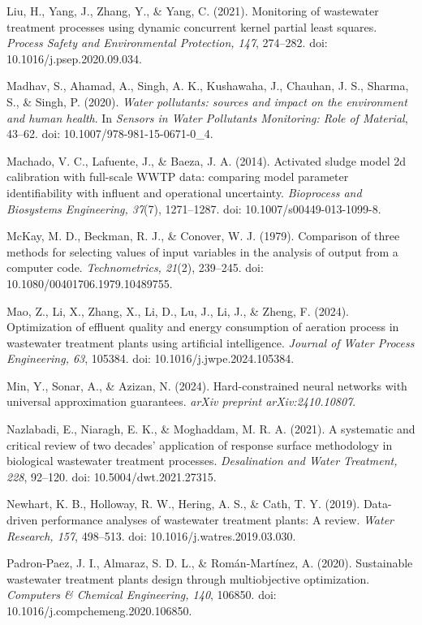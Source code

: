 \documentclass[a4paper,fleqn]{cas-sc}
\begin{document}
\noindent Liu, H., Yang, J., Zhang, Y., \& Yang, C. (2021). Monitoring of wastewater treatment processes using dynamic concurrent kernel partial least squares. \textit{Process Safety and Environmental Protection, 147}, 274--282. doi: 10.1016/\allowbreak j.psep.2020.09.034.

\noindent Madhav, S., Ahamad, A., Singh, A. K., Kushawaha, J., Chauhan, J. S., Sharma, S., \& Singh, P. (2020). \textit{Water pollutants: sources and impact on the environment and human health}. In \textit{Sensors in Water Pollutants Monitoring: Role of Material}, 43--62. doi: 10.1007/978-981-15-0671-0\_4.

\noindent Machado, V. C., Lafuente, J., \& Baeza, J. A. (2014). Activated sludge model 2d calibration with full-scale WWTP data: comparing model parameter identifiability with influent and operational uncertainty. \textit{Bioprocess and Biosystems Engineering, 37}(7), 1271--1287. doi: 10.1007/s00449-013-1099-8.

\noindent McKay, M. D., Beckman, R. J., \& Conover, W. J. (1979). Comparison of three methods for selecting values of input variables in the analysis of output from a computer code. \textit{Technometrics, 21}(2), 239--245. doi: 10.1080/00401706.1979.10489755.

\noindent Mao, Z., Li, X., Zhang, X., Li, D., Lu, J., Li, J., \& Zheng, F. (2024). Optimization of effluent quality and energy consumption of aeration process in wastewater treatment plants using artificial intelligence. \textit{Journal of Water Process Engineering, 63}, 105384. doi: 10.1016/j.jwpe.2024.105384.

\noindent Min, Y., Sonar, A., \& Azizan, N. (2024). Hard-constrained neural networks with universal approximation guarantees. \textit{arXiv preprint arXiv:2410.10807}.

\noindent Nazlabadi, E., Niaragh, E. K., \& Moghaddam, M. R. A. (2021). A systematic and critical review of two decades' application of response surface methodology in biological wastewater treatment processes. \textit{Desalination and Water Treatment, 228}, 92--120. doi: 10.5004/dwt.2021.27315.

\noindent Newhart, K. B., Holloway, R. W., Hering, A. S., \& Cath, T. Y. (2019). Data-driven performance analyses of wastewater treatment plants: A review. \textit{Water Research, 157}, 498--513. doi: 10.1016/j.watres.2019.03.030.

\noindent Padron-Paez, J. I., Almaraz, S. D. L., \& Rom\'an-Mart\'inez, A. (2020). Sustainable wastewater treatment plants design through multiobjective optimization. \textit{Computers \& Chemical Engineering, 140}, 106850. doi: 10.1016/\allowbreak j.compchemeng.2020.106850.
\end{document}
